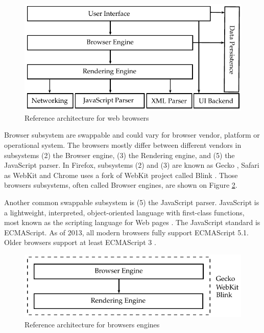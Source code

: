 \begin{figure}[!htb]
  \centering
  \includegraphics{chapters/basic_concepts/web_architecture.pdf}
  \caption{Reference architecture for web browsers}
  \label{figure:web_architecture}
\end{figure}

Browser subsystem are swappable and could vary for browser vendor, platform or operational system. The browsers mostly differ between different vendors in subsystems (2) the Browser engine, (3) the Rendering engine, and (5) the JavaScript parser. In Firefox, subsystems (2) and (3) are known as Gecko \cite{Firefox2013} \cite{Gecko2013}, Safari as WebKit \cite{Safari2013} \cite{WebKit2013} and Chrome uses a fork of WebKit project called Blink \cite{Chrome2010} \cite{Blink2013}. Those browsers subsystems, often called Browser engines, are shown on Figure \ref{figure:web_architecture_engines}.

Another common swappable subsystem is (5) the JavaScript parser. JavaScript is a lightweight, interpreted, object-oriented language with first-class functions, most known as the scripting language for Web pages \cite{Gecko2013}. The JavaScript standard is ECMAScript. As of 2013, all modern browsers fully support ECMAScript 5.1. Older browsers support at least ECMAScript 3 \cite{Gecko2013} \cite{International2009}.

\begin{figure}[!htb]
  \centering
  \includegraphics{chapters/basic_concepts/web_architecture_engines.pdf}
  \caption{Reference architecture for browsers engines}
  \label{figure:web_architecture_engines}
\end{figure}

